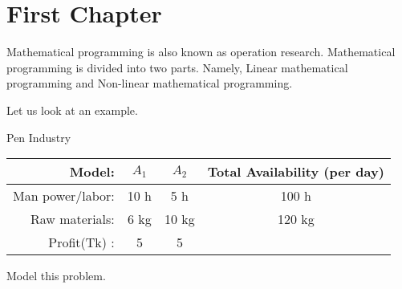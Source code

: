\documentclass[../main-sheet.tex]{subfiles}
\begin{document}
\chapter{First Chapter}
Mathematical programming is also known as operation research. Mathematical programming is divided into two parts. Namely, Linear mathematical programming and Non-linear mathematical programming.

Let us look at an example.
\begin{ex}
    Pen Industry
    \begin{table}[H]
        \centering
        \begin{tabular}{rccc}
            \toprule
            Model: & \(A_1\) & \(A_2\)& Total Availability (per day)\\ \midrule
            Man power/labor: & 10 h& 5 h& 100 h\\
            Raw materials: & 6 kg & 10 kg & 120  kg\\ \midrule
            Profit(Tk) : & 5&5&\\\bottomrule
        \end{tabular}
    \end{table}
    Model this problem.
\end{ex}
\end{document}
